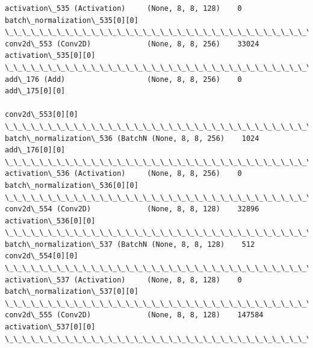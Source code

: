 \documentclass[11pt]{article}
\begin{document}
\begin{Verbatim}[commandchars=\\\{\}]
activation\_535 (Activation)     (None, 8, 8, 128)    0           batch\_normalization\_535[0][0]    
\_\_\_\_\_\_\_\_\_\_\_\_\_\_\_\_\_\_\_\_\_\_\_\_\_\_\_\_\_\_\_\_\_\_\_\_\_\_\_\_\_\_\_\_\_\_\_\_\_\_\_\_\_\_\_\_\_\_\_\_\_\_\_\_\_\_\_\_\_\_\_\_\_\_\_\_\_\_\_\_\_\_\_\_\_\_\_\_\_\_\_\_\_\_\_\_\_\_
conv2d\_553 (Conv2D)             (None, 8, 8, 256)    33024       activation\_535[0][0]             
\_\_\_\_\_\_\_\_\_\_\_\_\_\_\_\_\_\_\_\_\_\_\_\_\_\_\_\_\_\_\_\_\_\_\_\_\_\_\_\_\_\_\_\_\_\_\_\_\_\_\_\_\_\_\_\_\_\_\_\_\_\_\_\_\_\_\_\_\_\_\_\_\_\_\_\_\_\_\_\_\_\_\_\_\_\_\_\_\_\_\_\_\_\_\_\_\_\_
add\_176 (Add)                   (None, 8, 8, 256)    0           add\_175[0][0]                    
                                                                 conv2d\_553[0][0]                 
\_\_\_\_\_\_\_\_\_\_\_\_\_\_\_\_\_\_\_\_\_\_\_\_\_\_\_\_\_\_\_\_\_\_\_\_\_\_\_\_\_\_\_\_\_\_\_\_\_\_\_\_\_\_\_\_\_\_\_\_\_\_\_\_\_\_\_\_\_\_\_\_\_\_\_\_\_\_\_\_\_\_\_\_\_\_\_\_\_\_\_\_\_\_\_\_\_\_
batch\_normalization\_536 (BatchN (None, 8, 8, 256)    1024        add\_176[0][0]                    
\_\_\_\_\_\_\_\_\_\_\_\_\_\_\_\_\_\_\_\_\_\_\_\_\_\_\_\_\_\_\_\_\_\_\_\_\_\_\_\_\_\_\_\_\_\_\_\_\_\_\_\_\_\_\_\_\_\_\_\_\_\_\_\_\_\_\_\_\_\_\_\_\_\_\_\_\_\_\_\_\_\_\_\_\_\_\_\_\_\_\_\_\_\_\_\_\_\_
activation\_536 (Activation)     (None, 8, 8, 256)    0           batch\_normalization\_536[0][0]    
\_\_\_\_\_\_\_\_\_\_\_\_\_\_\_\_\_\_\_\_\_\_\_\_\_\_\_\_\_\_\_\_\_\_\_\_\_\_\_\_\_\_\_\_\_\_\_\_\_\_\_\_\_\_\_\_\_\_\_\_\_\_\_\_\_\_\_\_\_\_\_\_\_\_\_\_\_\_\_\_\_\_\_\_\_\_\_\_\_\_\_\_\_\_\_\_\_\_
conv2d\_554 (Conv2D)             (None, 8, 8, 128)    32896       activation\_536[0][0]             
\_\_\_\_\_\_\_\_\_\_\_\_\_\_\_\_\_\_\_\_\_\_\_\_\_\_\_\_\_\_\_\_\_\_\_\_\_\_\_\_\_\_\_\_\_\_\_\_\_\_\_\_\_\_\_\_\_\_\_\_\_\_\_\_\_\_\_\_\_\_\_\_\_\_\_\_\_\_\_\_\_\_\_\_\_\_\_\_\_\_\_\_\_\_\_\_\_\_
batch\_normalization\_537 (BatchN (None, 8, 8, 128)    512         conv2d\_554[0][0]                 
\_\_\_\_\_\_\_\_\_\_\_\_\_\_\_\_\_\_\_\_\_\_\_\_\_\_\_\_\_\_\_\_\_\_\_\_\_\_\_\_\_\_\_\_\_\_\_\_\_\_\_\_\_\_\_\_\_\_\_\_\_\_\_\_\_\_\_\_\_\_\_\_\_\_\_\_\_\_\_\_\_\_\_\_\_\_\_\_\_\_\_\_\_\_\_\_\_\_
activation\_537 (Activation)     (None, 8, 8, 128)    0           batch\_normalization\_537[0][0]    
\_\_\_\_\_\_\_\_\_\_\_\_\_\_\_\_\_\_\_\_\_\_\_\_\_\_\_\_\_\_\_\_\_\_\_\_\_\_\_\_\_\_\_\_\_\_\_\_\_\_\_\_\_\_\_\_\_\_\_\_\_\_\_\_\_\_\_\_\_\_\_\_\_\_\_\_\_\_\_\_\_\_\_\_\_\_\_\_\_\_\_\_\_\_\_\_\_\_
conv2d\_555 (Conv2D)             (None, 8, 8, 128)    147584      activation\_537[0][0]             
\_\_\_\_\_\_\_\_\_\_\_\_\_\_\_\_\_\_\_\_\_\_\_\_\_\_\_\_\_\_\_\_\_\_\_\_\_\_\_\_\_\_\_\_\_\_\_\_\_\_\_\_\_\_\_\_\_\_\_\_\_\_\_\_\_\_\_\_\_\_\_\_\_\_\_\_\_\_\_\_\_\_\_\_\_\_\_\_\_\_\_\_\_\_\_\_\_\_

\end{Verbatim}
\end{document}
